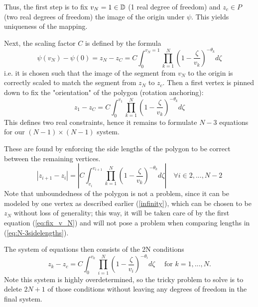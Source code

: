 Thus, the first step is to fix $v_N=1\in\mathbb{D}$ (1 real degree of freedom) and $z_c\in P$ (two real degrees of freedom) the image of the origin under $\psi$. This yields uniqueness of the mapping.

Next, the scaling factor $C$ is defined by the formula \cite[Eq. 2.3]{Trefethen1980_SCnumericalcomputation}
\begin{equation} \label{eq:fix_v_N}
    \psi(v_N) - \psi(0) = z_N - z_C = C \int_{0}^{v_N=1} \prod_{k=1}^{N} (1-\frac{\zeta}{v_k})^{-\theta_k} d\zeta
\end{equation}
i.e. it is chosen such that the image of the segment from $v_N$ to the origin is correctly scaled to match the segment from $z_N$ to $z_c$.
Then a first vertex is pinned down to fix the "orientation" of the polygon (rotation anchoring):
\begin{equation} \label{eq:fix_v_1}
        z_1 - z_C = C \int_{0}^{v_1} \prod_{k=1}^{N} (1-\frac{\zeta}{v_k})^{-\theta_k} d\zeta
\end{equation}
This defines two real constraints, hence it remains to formulate $N-3$ equations for our $(N-1)\times (N-1)$ system.

\cite[Fig. 3]{Trefethen1980_SCnumericalcomputation}

These are found by enforcing the side lengths of the polygon to be correct between the remaining vertices.
\begin{equation} \label{eq:N-3sidelengths}
        |z_{i+1} - z_i| = |C \int_{v_i}^{v_{i+1}} \prod_{k=1}^{N} (1-\frac{\zeta}{v_k})^{-\theta_k} d\zeta| \quad  \forall i\in 2, ..., N-2
\end{equation}
Note that unboundedness of the polygon is not a problem, since it can be modeled by one vertex as described earlier (\ref{infinity}), which can be chosen to be $z_N$ without loss of generality; this way, it will be taken care of by the first equation (\ref{eq:fix_v_N}) and will not pose a problem when comparing lengths in (\ref{eq:N-3sidelengths}).

\iffalse
The system of equations then consists of the 2N conditions
\begin{equation}
    z_{k}-z_c = C\int_{0}^{v_{k}} \prod_{i=1}^{N} (1-\frac{\zeta}{v_i})^{-\theta_i} d\zeta \quad \text{ for } k=1,...,N.
\end{equation}
Note this system is highly overdetermined, so the tricky problem to solve is to delete $2N+1$ of those conditions without leaving any degrees of freedom in the final system. 


